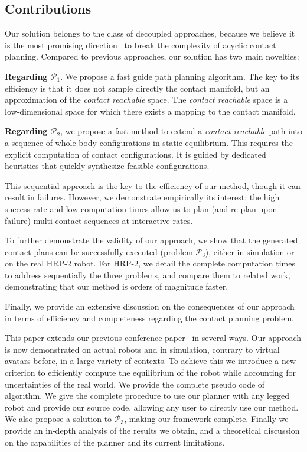 \subsection{Contributions}

Our solution belongs to the class of decoupled approaches, because we believe it is the most promising direction~\citep{DBLP:conf/iser/EscandeKMG08} to break the complexity of acyclic contact planning. Compared to previous approaches, our solution has two main novelties: 

\noindent \textbf{Regarding $\mathcal{P}_1$}. We propose a fast guide path planning algorithm. The key to its efficiency is that it does not sample directly the contact manifold, but an approximation of the \textit{contact reachable} space. The \textit{contact reachable} space is a low-dimensional space for which there exists a mapping to the contact manifold.

\noindent \textbf{Regarding $\mathcal{P}_2$},  we propose a fast method to extend a \textit{contact reachable} path into a sequence of whole-body configurations in static equilibrium. This  requires the explicit computation of contact configurations. It is guided by dedicated heuristics that quickly synthesize feasible configurations.

This sequential approach is the key to the efficiency of our method, though it
can result in failures. However, we demonstrate empirically its interest: the high success rate and low computation times allow us to plan (and re-plan upon failure) multi-contact sequences at \gls{interactive} rates.

To further demonstrate the validity of our approach, we show that the generated contact plans  can be successfully executed (problem  $\mathcal{P}_3$), either in simulation or on the real HRP-2 robot. For HRP-2, we detail the complete computation times to address sequentially the three problems, and compare them to related work, demonstrating that our method is orders of magnitude faster.

Finally, we provide an extensive discussion on the consequences of our approach in terms of efficiency and completeness regarding the contact planning problem. 

This paper extends our previous conference paper~\citep{tonneauisrr15} in several ways. Our approach is now demonstrated on actual robots and in simulation, contrary to virtual avatars before, in a large variety of contexts. To achieve this we introduce a new criterion to efficiently compute the equilibrium of the robot while accounting for uncertainties of the real world. We provide the complete pseudo code of algorithm. We give the complete procedure to use our planner with any legged robot and provide our source code, allowing any user to directly use our method. We also propose a solution to $\mathcal{P}_3$, making our framework complete. Finally we provide an in-depth analysis of the results we obtain, and a theoretical discussion on the capabilities of the planner and its current limitations.
